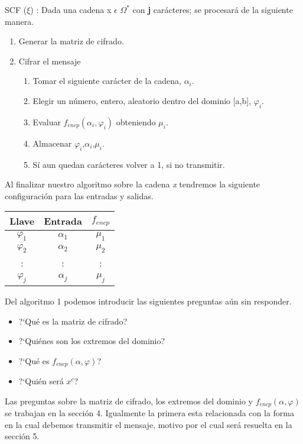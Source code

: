 \begin{algo}
SCF ($\xi$) : Dada una cadena x $\epsilon$ $\Omega^{*}$ con \textbf{j} car\'acteres; se procesar\'a de la siguiente manera.
\begin{enumerate}
 \item {Generar la matriz de cifrado.}
 \item { Cifrar el mensaje
	\begin{enumerate}
	  \item Tomar el siguiente car\'acter de la cadena, $\alpha_{i}$.
	  \item Elegir un n\'umero, entero, aleatorio dentro del dominio [a,b], $\varphi_{i}$.
	  \item Evaluar $f_{encp}(\alpha_{i},\varphi_{i})$ obteniendo $\mu_{i}$.
	  \item Almacenar $\varphi_{i}$,$\alpha_{i}$,$\mu_{i}$.
	 \item S\'i aun quedan car\'acteres volver a 1, si no transmitir.
	\end{enumerate}
 }
\end{enumerate}
\end{algo}

Al finalizar nuestro algoritmo sobre la cadena \emph{x} tendremos la siguiente configuraci\'on para las entradas y salidas.

\begin{center}
  \begin{tabular}{ |c | c | c | }
    \hline
    Llave & Entrada & $f_{encp}$ \\	
    \hline
    $\varphi_{1}$ & $\alpha_{1}$ & $\mu_{1}$ \\
    \hline
    $\varphi_{2}$ & $\alpha_{2}$ & $\mu_{2}$ \\
    \hline
    : & : & : \\
    \hline
    $\varphi_{j}$ & $\alpha_{j}$ & $\mu_{j}$ \\
    \hline
  \end{tabular}
\end{center}

Del algoritmo 1 podemos introducir las siguientes preguntas a\'un sin responder.

\begin{itemize}
	\item ?`Qu\'e es la matriz de cifrado?
	\item ?`Qui\'enes son los extremos del dominio?
	\item ?`Qu\'e es $f_{encp}(\alpha,\varphi)$?
	\item ?`Qui\'en ser\'a $x^{c}$?
\end{itemize}

Las preguntas sobre la matriz de cifrado, los extremos del dominio y $f_{encp}(\alpha,\varphi)$ se trabajan en la secci\'on 4. Igualmente la primera esta relacionada con la forma en la cual debemos transmitir el mensaje, motivo por el cual ser\'a resuelta en la secci\'on 5.
